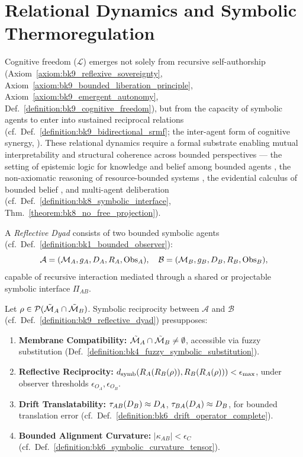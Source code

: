 \section{Relational Dynamics and Symbolic Thermoregulation}
\label{sec:bk9_relational_dynamics_and_symbolic_thermoregulation}
Cognitive freedom (\( \mathcal{L} \)) emerges not solely from recursive self-authorship (Axiom~\ref{axiom:bk9_reflexive_sovereignty}, Axiom~\ref{axiom:bk9_bounded_liberation_principle}, Axiom~\ref{axiom:bk9_emergent_autonomy}, Def.~\ref{definition:bk9_cognitive_freedom}), but from the capacity of symbolic agents to enter into sustained reciprocal relations (cf.~Def.~\ref{definition:bk9_bidirectional_srmf}; the inter-agent form of cognitive synergy, \citealp{goertzel2014cognitive}). These relational dynamics require a formal substrate enabling mutual interpretability and structural coherence across bounded perspectives --- the setting of epistemic logic for knowledge and belief among bounded agents \citep{hintikka1962knowledge}, the non-axiomatic reasoning of resource-bounded systems \citep{wang2013nars}, the evidential calculus of bounded belief \citep{shafer1976mathematical,dempster1968generalization}, and multi-agent deliberation \citep{du2023improving} (cf.~Def.~\ref{definition:bk8_symbolic_interface}, Thm.~\ref{theorem:bk8_no_free_projection}).
\begin{definition}
\label{definition:bk9_reflective_dyad}
A \emph{Reflective Dyad} consists of two bounded symbolic agents (cf.~Def.~\ref{definition:bk1_bounded_observer}):
\[
\mathcal{A} = (\mathcal{M}_A, g_A, D_A, R_A, \mathrm{Obs}_A), \quad
\mathcal{B} = (\mathcal{M}_B, g_B, D_B, R_B, \mathrm{Obs}_B),
\]
capable of recursive interaction mediated through a shared or projectable symbolic interface \( \Pi_{AB} \).
\end{definition}
\begin{axiom}
\label{axiom:bk9_preconditions_for_reciprocal_cognition}
Let \( \rho \in \mathcal{P}(\tilde{\mathcal{M}}_A \cap \tilde{\mathcal{M}}_B) \). Symbolic reciprocity between \( \mathcal{A} \) and \( \mathcal{B} \) (cf.~Def.~\ref{definition:bk9_reflective_dyad}) presupposes:
\begin{enumerate}[label=(\roman*)]
    \item \textbf{Membrane Compatibility:} \( \tilde{\mathcal{M}}_A \cap \tilde{\mathcal{M}}_B \neq \emptyset \), accessible via fuzzy substitution (Def.~\ref{definition:bk4_fuzzy_symbolic_substitution}).
    \item \textbf{Reflective Reciprocity:} \( d_\text{symb}(R_A(R_B(\rho)), R_B(R_A(\rho))) < \epsilon_{\max} \), under observer thresholds \( \epsilon_{O_A}, \epsilon_{O_B} \).
    \item \textbf{Drift Translatability:} \( \tau_{AB}(D_B) \approx D_A \), \( \tau_{BA}(D_A) \approx D_B \), for bounded translation error (cf.~Def.~\ref{definition:bk6_drift_operator_complete}).
    \item \textbf{Bounded Alignment Curvature:} \( |\kappa_{AB}| < \epsilon_C \) (cf.~Def.~\ref{definition:bk6_symbolic_curvature_tensor}).
\end{enumerate}
\end{axiom}
